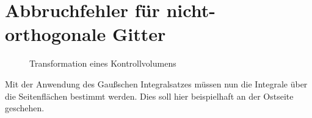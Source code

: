 






\section{Abbruchfehler für nicht-orthogonale Gitter}
\begin{figure}[ht]
  
\centering
\caption{Transformation eines Kontrollvolumens}
\end{figure}
Mit der Anwendung des Gaußschen Integralsatzes müssen nun die Integrale über
die Seitenflächen bestimmt werden. Dies soll hier beispielhaft an der Ostseite geschehen.

